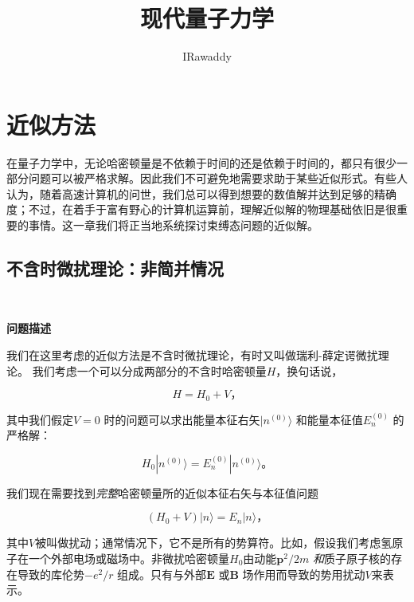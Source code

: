 ﻿\documentclass[UTF8,twoside]{ctexart}
\begin{document}
\setcounter{section}{4}
\title{现代量子力学}
\author{IRawaddy}

\maketitle
\thispagestyle{empty}

\tableofcontents
\clearpage
\section{近似方法}

\noindent 在量子力学中，无论哈密顿量是不依赖于时间的还是依赖于时间的，都只有很少一部分问题可以被严格求解。因此我们不可避免地需要求助于某些近似形式。有些人认为，随着高速计算机的问世，我们总可以得到想要的数值解并达到足够的精确度；不过，在着手于富有野心的计算机运算前，理解近似解的物理基础依旧是很重要的事情。这一章我们将正当地系统探讨束缚态问题的近似解。

\subsection{不含时微扰理论：非简并情况}

\

\noindent \textbf{问题描述}

\noindent 我们在这里考虑的近似方法是不含时微扰理论，有时又叫做瑞利-薛定谔微扰理论。 我们考虑一个可以分成两部分的不含时哈密顿量$H$，换句话说，

\begin{equation} \label{5.1.1}
H = H_0 + V\text{，}
\end{equation}

\noindent 其中我们假定$V = 0$ 时的问题可以求出能量本征右矢$|n^{(0)}\rangle$ 和能量本征值$E_{n}^{(0)}$ 的严格解：

\begin{equation} \label{5.1.2}
H_0|n^{(0)}\rangle = E_{n}^{(0)}|n^{(0)}\rangle\text{。}
\end{equation}

\noindent 我们现在需要找到\emph{完整}哈密顿量所的近似本征右矢与本征值问题

\begin{equation} \label{5.1.3}
(H_0 + V)|n\rangle = E_n|n\rangle\text{，}
\end{equation}

\noindent 其中$V$被叫做扰动；通常情况下，它不是所有的势算符。比如，假设我们考虑氢原子在一个外部电场或磁场中。非微扰哈密顿量$H_0$由动能$\mathbf{p}^2/2m$ \emph{和}质子原子核的存在导致的库伦势$-e^2/r$ 组成。只有与外部$\mathbf{E}$ 或$\mathbf{B}$ 场作用而导致的势用扰动$V$来表示。
\end{document}
